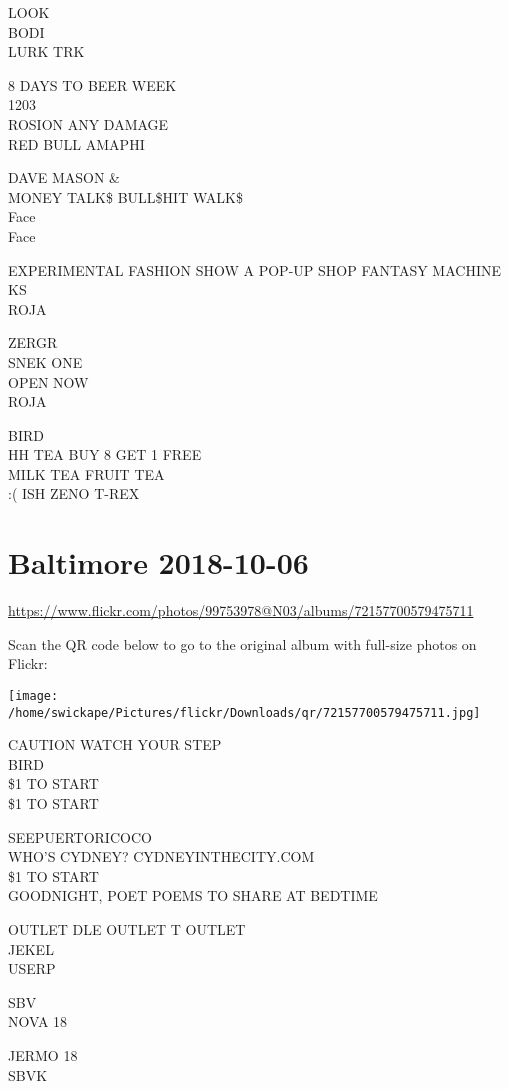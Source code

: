 \documentclass[10pt,letterpaper]{article}
\begin{document}
LOOK\\
BODI\\
LURK TRK

8 DAYS TO BEER WEEK\\
1203\\
ROSION ANY DAMAGE\\
RED BULL AMAPHI

DAVE MASON \&\\
MONEY TALK\$ BULL\$HIT WALK\$\\
Face\\
Face

EXPERIMENTAL FASHION SHOW A POP{-}UP SHOP FANTASY MACHINE\\
KS\\
ROJA

ZERGR\\
SNEK ONE\\
OPEN NOW\\
ROJA

BIRD\\
HH TEA BUY 8 GET 1 FREE\\
MILK TEA FRUIT TEA\\
:( ISH ZENO T{-}REX


\section*{Baltimore 2018-10-06}

\url{https://www.flickr.com/photos/99753978@N03/albums/72157700579475711}

Scan the QR code below to go to the original album with full-size photos on Flickr:

\texttt{[image: /home/swickape/Pictures/flickr/Downloads/qr/72157700579475711.jpg]}


CAUTION WATCH YOUR STEP\\
BIRD\\
\$1 TO START\\
\$1 TO START

SEEPUERTORICOCO\\
WHO'S CYDNEY?  CYDNEYINTHECITY.COM\\
\$1 TO START\\
GOODNIGHT, POET POEMS TO SHARE AT BEDTIME

OUTLET DLE OUTLET T OUTLET\\
JEKEL\\
USERP

SBV\\
NOVA 18

JERMO 18\\
SBVK
\end{document}
